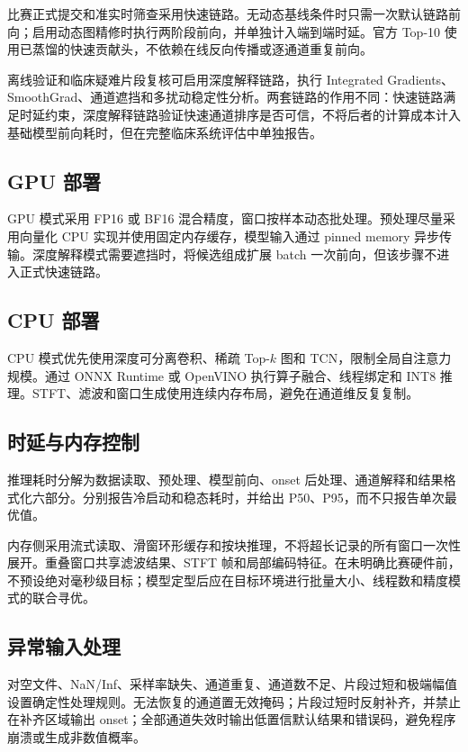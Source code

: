 比赛正式提交和准实时筛查采用快速链路。无动态基线条件时只需一次默认链路前向；启用动态图精修时执行两阶段前向，并单独计入端到端时延。官方 Top-10 使用已蒸馏的快速贡献头，不依赖在线反向传播或逐通道重复前向。

离线验证和临床疑难片段复核可启用深度解释链路，执行 Integrated Gradients、SmoothGrad、通道遮挡和多扰动稳定性分析。两套链路的作用不同：快速链路满足时延约束，深度解释链路验证快速通道排序是否可信，不将后者的计算成本计入基础模型前向耗时，但在完整临床系统评估中单独报告。

\subsection{GPU 部署}

GPU 模式采用 FP16 或 BF16 混合精度，窗口按样本动态批处理。预处理尽量采用向量化 CPU 实现并使用固定内存缓存，模型输入通过 pinned memory 异步传输。深度解释模式需要遮挡时，将候选组成扩展 batch 一次前向，但该步骤不进入正式快速链路。

\subsection{CPU 部署}

CPU 模式优先使用深度可分离卷积、稀疏 Top-$k$ 图和 TCN，限制全局自注意力规模。通过 ONNX Runtime 或 OpenVINO 执行算子融合、线程绑定和 INT8 推理。STFT、滤波和窗口生成使用连续内存布局，避免在通道维反复复制。

\subsection{时延与内存控制}

推理耗时分解为数据读取、预处理、模型前向、onset 后处理、通道解释和结果格式化六部分。分别报告冷启动和稳态耗时，并给出 P50、P95，而不只报告单次最优值。

内存侧采用流式读取、滑窗环形缓存和按块推理，不将超长记录的所有窗口一次性展开。重叠窗口共享滤波结果、STFT 帧和局部编码特征。在未明确比赛硬件前，不预设绝对毫秒级目标；模型定型后应在目标环境进行批量大小、线程数和精度模式的联合寻优。

\subsection{异常输入处理}

对空文件、NaN/Inf、采样率缺失、通道重复、通道数不足、片段过短和极端幅值设置确定性处理规则。无法恢复的通道置无效掩码；片段过短时反射补齐，并禁止在补齐区域输出 onset；全部通道失效时输出低置信默认结果和错误码，避免程序崩溃或生成非数值概率。


